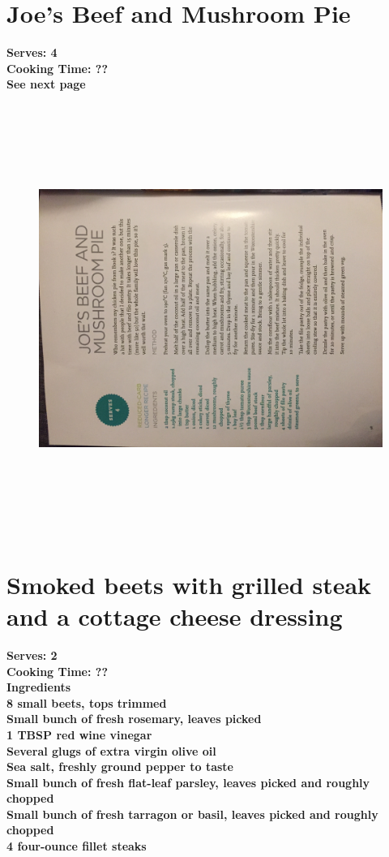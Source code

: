 \documentclass[18pt, oneside]{book}
\begin{document}
\section{Joe's Beef and Mushroom Pie}
\bf{Serves: 4} \\
\bf{Cooking Time: ??} \\
See next page
\begin{figure}[h!]
  \begin{center}
  \includegraphics[height = 14cm, angle=270]{BeefPie}
  \end{center}
\end{figure}

\section{Smoked beets with grilled steak and a cottage cheese dressing}
\bf{Serves: 2} \\
\bf{Cooking Time: ??} \\

\bf{Ingredients} \normalfont \\ 
8 small beets, tops trimmed \\
Small bunch of fresh rosemary, leaves picked \\
1 TBSP red wine vinegar \\
Several glugs of extra virgin olive oil \\
Sea salt, freshly ground pepper to taste \\
Small bunch of fresh flat-leaf parsley, leaves picked and roughly chopped \\
Small bunch of fresh tarragon or basil, leaves picked and roughly chopped \\
4 four-ounce fillet steaks \\
\end{document}
